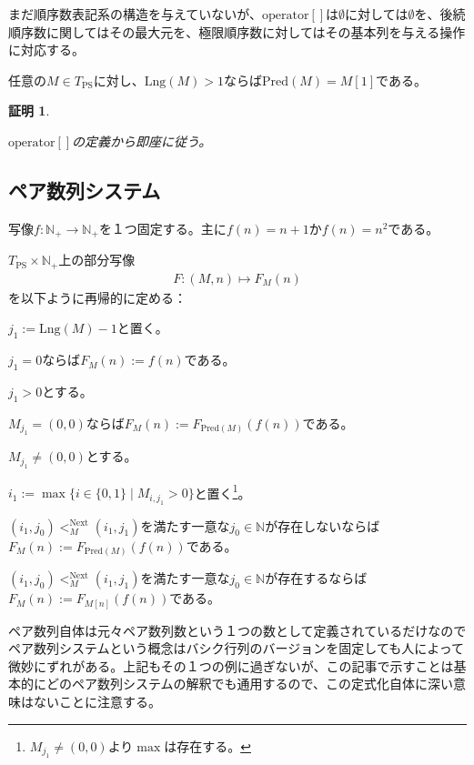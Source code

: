 \documentclass[dvipdfmx,uplatex]{jsarticle}
\theoremstyle{customnonumberbreakfortheorem}
\theoremstyle{customnonumberbreakforproof}
\newtheorem{hideableproof}{証明}
\begin{document}
まだ順序数表記系の構造を与えていないが、\(\textrm{operator}[]\)は\(\emptyset\)に対しては\(\emptyset\)を、後続順序数に関してはその最大元を、極限順序数に対してはその基本列を与える操作に対応する。

\begin{proposition}\label{Predが1で表されること}
	任意の\(M \in T_{\textrm{PS}}\)に対し、\(\textrm{Lng}(M) > 1\)ならば\(\textrm{Pred}(M) = M[1]\)である。
\end{proposition}

\begin{hideableproof}
	\begin{indented}
		\item \(\textrm{operator}[]\)の定義から即座に従う。
	\end{indented}
\end{hideableproof}


\subsection{ペア数列システム}

写像\(f \colon \mathbb{N}_{+} \to \mathbb{N}_{+}\)を１つ固定する。主に\(f(n) = n+1\)か\(f(n) = n^2\)である。

\(T_{\textrm{PS}} \times \mathbb{N}_{+}\)上の部分写像
\begin{eqnarray*}
F \colon (M,n) \mapsto F_M(n)
\end{eqnarray*}
を以下ように再帰的に定める：
\begin{nenumerate}
	\item \(j_1 := \textrm{Lng}(M)-1\)と置く。
	\item \(j_1 = 0\)ならば\(F_M(n) := f(n)\)である。
	\item \(j_1 > 0\)とする。
	\begin{nenumerate}
		\item \(M_{j_1} = (0,0)\)ならば\(F_M(n) := F_{\textrm{Pred}(M)}(f(n))\)である。
		\item \(M_{j_1} \neq (0,0)\)とする。
		\begin{nenumerate}
			\item \(i_1 := \max \{i \in \{0,1\} \mid M_{i,j_1} > 0\}\)と置く\footnote{\(M_{j_1} \neq (0,0)\)より\(\max\)は存在する。}。
			\item \((i_1,j_0) <_M^{\textrm{Next}} (i_1,j_1)\)を満たす一意な\(j_0 \in \mathbb{N}\)が存在しないならば\(F_M(n) := F_{\textrm{Pred}(M)}(f(n))\)である。
			\item \((i_1,j_0) <_M^{\textrm{Next}} (i_1,j_1)\)を満たす一意な\(j_0 \in \mathbb{N}\)が存在するならば\(F_M(n) := F_{M[n]}(f(n))\)である。
		\end{nenumerate}
	\end{nenumerate}
\end{nenumerate}
ペア数列自体は元々ペア数列数という１つの数として定義されているだけなのでペア数列システムという概念はバシク行列のバージョンを固定しても人によって微妙にずれがある。上記もその１つの例に過ぎないが、この記事で示すことは基本的にどのペア数列システムの解釈でも通用するので、この定式化自体に深い意味はないことに注意する。
\end{document}
